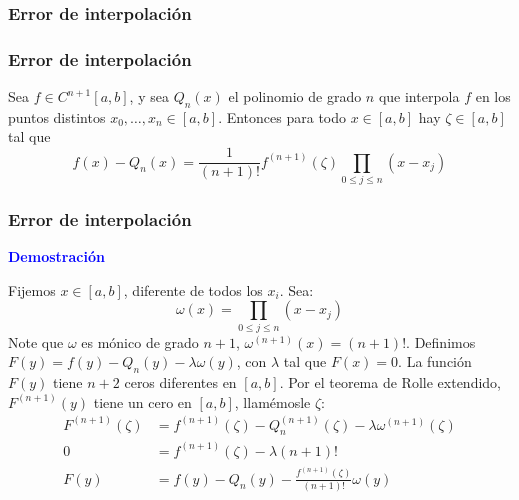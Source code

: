 \documentclass[english, spanish, fleqn,%
hyperref = {colorlinks, urlcolor = blue}%
]{beamer}
\begin{document}
\begin{frame}
  \setcounter{beamerpauses}{2}
  \frametitle{Error de interpolación}

\end{frame}

\begin{frame}
  \frametitle{Error de interpolación}

  \begin{theorem}
    Sea \(f \in C^{n+1}[a, b]\),
    y sea \(Q_n(x)\) el polinomio de grado \(n\)
    que interpola \(f\)
    en los puntos distintos \(x_0, \dotsc, x_n \in [a, b]\).
    Entonces para todo \(x \in [a, b]\)
    hay \(\zeta \in [a, b]\) tal que
    \begin{equation*}
      f(x) - Q_n(x)
        = \frac{1}{(n + 1)!} f^{(n+1)}(\zeta)
            \prod_{0 \le j \le n}(x - x_j)
    \end{equation*}
  \end{theorem}
\end{frame}

\begin{frame}
  \frametitle{Error de interpolación}

  \textbf{\large\textcolor{blue}{Demostración}}

  Fijemos \(x \in [a, b]\),
  diferente de todos los \(x_i\).
  Sea:
  \begin{equation*}
    \omega(x)
      = \prod_{0 \le j \le n}(x - x_j)
  \end{equation*}
  Note que \(\omega\) es mónico de grado \(n + 1\),
  \(\omega^{(n + 1)}(x) = (n + 1)!\).
  Definimos \(F(y) = f(y) - Q_n(y) - \lambda \omega(y)\),
  con \(\lambda\) tal que \(F(x) = 0\).
  La función \(F(y)\) tiene \(n + 2\) ceros diferentes en \([a, b]\).
  Por el teorema de Rolle extendido,
  \(F^{(n + 1)}(y)\) tiene un cero en \([a, b]\),
  llamémosle \(\zeta\):
  \begin{align*}
    F^{(n + 1)}(\zeta)
      &= f^{(n + 1)}(\zeta) - Q_n^{(n + 1)}(\zeta)
           - \lambda \omega^{(n + 1)}(\zeta) \\
    0
      &= f^{(n + 1)}(\zeta) - \lambda (n + 1)! \\
    F(y)
      &= f(y) - Q_n(y) - \frac{f^{(n + 1)}(\zeta)}{(n + 1)!} \omega(y)
  \end{align*}
\end{frame}
\end{document}
